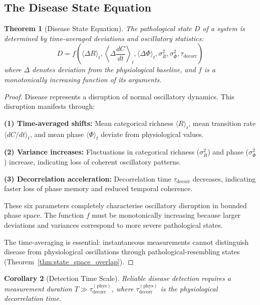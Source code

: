 \documentclass[11pt,twocolumn,a4paper]{article}
\newtheorem{theorem}{Theorem}[section]
\newtheorem{corollary}[theorem]{Corollary}
\theoremstyle{definition}
\theoremstyle{remark}
\newcommand{\taudecorr}{\tau_{\mathrm{decorr}}}
\begin{document}
\subsection{The Disease State Equation}

\begin{theorem}[Disease State Equation]
\label{thm:disease_state_equation}
The pathological state $D$ of a system is determined by time-averaged deviations and oscillatory statistics:
\begin{equation}
D = f\left(\langle\Delta R\rangle_t, \left\langle\Delta\frac{dC}{dt}\right\rangle_t, \langle\Delta\Phi\rangle_t, \sigma_R^2, \sigma_\Phi^2, \taudecorr\right)
\label{eq:disease_state}
\end{equation}
where $\Delta$ denotes deviation from the physiological baseline, and $f$ is a monotonically increasing function of its arguments.
\end{theorem}

\begin{proof}
Disease represents a disruption of normal oscillatory dynamics. This disruption manifests through:

\textbf{(1) Time-averaged shifts:} Mean categorical richness $\langle R \rangle_t$, mean transition rate $\langle dC/dt \rangle_t$, and mean phase $\langle \Phi \rangle_t$ deviate from physiological values.

\textbf{(2) Variance increases:} Fluctuations in categorical richness ($\sigma_R^2$) and phase ($\sigma_\Phi^2$) increase, indicating loss of coherent oscillatory patterns.

\textbf{(3) Decorrelation acceleration:} Decorrelation time $\taudecorr$ decreases, indicating faster loss of phase memory and reduced temporal coherence.

These six parameters completely characterise oscillatory disruption in bounded phase space. The function $f$ must be monotonically increasing because larger deviations and variances correspond to more severe pathological states.

The time-averaging is essential: instantaneous measurements cannot distinguish disease from physiological oscillations through pathological-resembling states (Theorem~\ref{thm:state_space_overlap}).
\end{proof}



\begin{corollary}[Detection Time Scale]
\label{cor:detection_time_scale}
Reliable disease detection requires a measurement duration $T \gg \taudecorr^{\mathrm{(phys)}}$, where $\taudecorr^{\mathrm{(phys)}}$ is the physiological decorrelation time.
\end{corollary}
\end{document}
